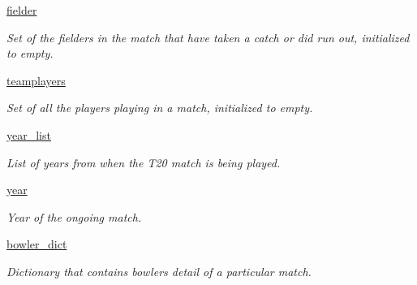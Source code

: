 \begin{DoxyCompactItemize}
\mbox{\label{classaccess_1_1Read_ae85fd7cf6271c2403173a1eff11e1356}} 
\hyperlink{classaccess_1_1Read_ae85fd7cf6271c2403173a1eff11e1356}{fielder}
\begin{DoxyCompactList}\small\item\em Set of the fielders in the match that have taken a catch or did run out, initialized to empty. \end{DoxyCompactList}\item 
\mbox{\label{classaccess_1_1Read_a01ed8a9260da62f6e41c3fae5e809013}} 
\hyperlink{classaccess_1_1Read_a01ed8a9260da62f6e41c3fae5e809013}{teamplayers}
\begin{DoxyCompactList}\small\item\em Set of all the players playing in a match, initialized to empty. \end{DoxyCompactList}\item 
\mbox{\label{classaccess_1_1Read_a920478896db74ed5dcfbc6434392e337}} 
\hyperlink{classaccess_1_1Read_a920478896db74ed5dcfbc6434392e337}{year\+\_\+list}
\begin{DoxyCompactList}\small\item\em List of years from when the T20 match is being played. \end{DoxyCompactList}\item 
\mbox{\label{classaccess_1_1Read_aa96cfa5afd9ef42a5b1461a6f751f912}} 
\hyperlink{classaccess_1_1Read_aa96cfa5afd9ef42a5b1461a6f751f912}{year}
\begin{DoxyCompactList}\small\item\em Year of the ongoing match. \end{DoxyCompactList}\item 
\mbox{\label{classaccess_1_1Read_ae1a636d9a99575d225e9124f807bc1be}} 
\hyperlink{classaccess_1_1Read_ae1a636d9a99575d225e9124f807bc1be}{bowler\+\_\+dict}
\begin{DoxyCompactList}\small\item\em Dictionary that contains bowler\textquotesingle{}s detail of a particular match. \end{DoxyCompactList}\item 
\mbox{\label{classaccess_1_1Read_a39dacaa1561558d474eb83c5d95f58f3}} 

\end{DoxyCompactItemize}

